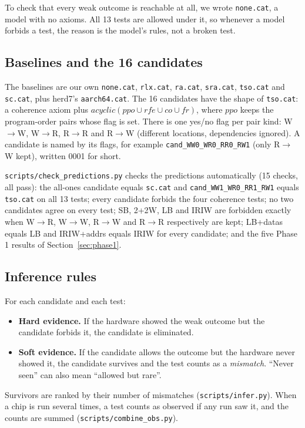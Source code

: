 \documentclass[11pt]{article}
\newcommand{\pair}[2]{#1$\to$#2}
\newcommand{\cand}[1]{\texttt{#1}}
\begin{document}
To check that every weak outcome is reachable at all, we wrote \texttt{none.cat}, a model with no
axioms. All 13 tests are allowed under it, so whenever a model forbids a test, the reason is the
model's rules, not a broken test.

\subsection{Baselines and the 16 candidates}
The baselines are our own \texttt{none.cat}, \texttt{rlx.cat}, \texttt{ra.cat}, \texttt{sra.cat},
\texttt{tso.cat} and \texttt{sc.cat}, plus herd7's \texttt{aarch64.cat}. The 16 candidates have the shape
of \texttt{tso.cat}: a coherence axiom plus
$\mathit{acyclic}(\mathit{ppo} \cup \mathit{rfe} \cup \mathit{co} \cup \mathit{fr})$, where
$\mathit{ppo}$ keeps the program-order pairs whose flag is set. There is one yes/no flag per pair kind:
\pair{W}{W}, \pair{W}{R}, \pair{R}{R} and \pair{R}{W} (different locations, dependencies ignored).
A candidate is named by its flags, for example \cand{cand\_WW0\_WR0\_RR0\_RW1} (only \pair{R}{W} kept),
written 0001 for short.

\texttt{scripts/check\_predictions.py} checks the predictions automatically (15 checks, all pass):
the all-ones candidate equals \texttt{sc.cat} and \cand{cand\_WW1\_WR0\_RR1\_RW1} equals \texttt{tso.cat}
on all 13 tests; every candidate forbids the four coherence tests; no two candidates agree on every
test; SB, 2+2W, LB and IRIW are forbidden exactly when \pair{W}{R}, \pair{W}{W}, \pair{R}{W} and
\pair{R}{R} respectively are kept; LB+datas equals LB and IRIW+addrs equals IRIW for every candidate;
and the five Phase 1 results of Section~\ref{sec:phase1}.

\subsection{Inference rules}
For each candidate and each test:
\begin{itemize}
  \item \textbf{Hard evidence.} If the hardware showed the weak outcome but the candidate forbids it,
        the candidate is eliminated.
  \item \textbf{Soft evidence.} If the candidate allows the outcome but the hardware never showed it,
        the candidate survives and the test counts as a \emph{mismatch}. ``Never seen'' can also mean
        ``allowed but rare''.
\end{itemize}
Survivors are ranked by their number of mismatches (\texttt{scripts/infer.py}). When a chip is run
several times, a test counts as observed if any run saw it, and the counts are summed
(\texttt{scripts/combine\_obs.py}).
\end{document}
